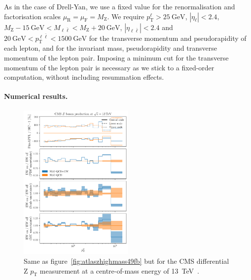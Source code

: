 As in the case of Drell-Yan, we use a fixed value for the renormalisation and factorisation 
scales $\mu_\mathrm{R}=\mu_\mathrm{F}=M_\mathrm{Z}$.
We require $p_\mathrm{T}^\ell>\SI{25}{\giga\electronvolt}$, $|\eta_\ell|<2.4$,
$M_\mathrm{Z}-\SI{15}{\giga\electronvolt}<M_{\ell\bar\ell}<M_\mathrm{Z}+\SI{20}{\giga\electronvolt}$,
$|\eta_{\ell\bar\ell}|<2.4$ and $\SI{20}{\giga\electronvolt}<p_\mathrm{T}^{\ell\bar\ell}<\SI{1500}{\giga\electronvolt}$ for the
transverse momentum and pseudorapidity of each lepton, and for the invariant mass,
pseudorapidity and transverse momentum of the lepton pair. Imposing a minimum cut for the transverse momentum of the lepton pair 
is necessary as we stick to a fixed-order computation, without including resummation effects.

\paragraph{Numerical results.}
\begin{figure}[!t]
    \centering
    \includegraphics[width=0.5\textwidth]{figures/pineappl_CMS_Z_13_TEV}
    \caption{Same as figure~\ref{fig:atlaszhighmass49fb} but for the 
      CMS differential Z $p_\mathrm{T}$ measurement at a centre-of-mass energy of
      \SI{13}{\tera\electronvolt}~\cite{Sirunyan:2019bzr}.}
    \label{fig:cmsZ13TeV}
\end{figure}

